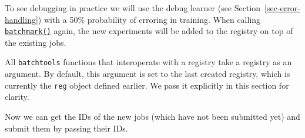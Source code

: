 To see debugging in practice we will use the debug
learner (see Section~\ref{sec-error-handling}) with a 50\% probability
of erroring in training. When calling
\href{https://mlr3batchmark.mlr-org.com/reference/batchmark.html}{\texttt{batchmark()}}
again, the new experiments will be added to the registry on top of the
existing jobs.

\begin{Shaded}
\begin{Highlighting}[]
\OtherTok{=} 
  \NormalTok{(}\NormalTok{, }  \NormalTok{)}

\end{Highlighting}
\end{Shaded}

\begin{tcolorbox}[enhanced jigsaw, opacitybacktitle=0.6, rightrule=.15mm, opacityback=0, arc=.35mm, breakable, titlerule=0mm, colframe=quarto-callout-tip-color-frame, coltitle=black, bottomrule=.15mm, toprule=.15mm, colback=white, colbacktitle=quarto-callout-tip-color!10!white, bottomtitle=1mm, toptitle=1mm, title=\textcolor{quarto-callout-tip-color}{\faLightbulb}\hspace{0.5em}{Registry Argument}, leftrule=.75mm, left=2mm]

All \texttt{batchtools} functions that interoperate with a registry take
a registry as an argument. By default, this argument is set to the last
created registry, which is currently the \texttt{reg} object defined
earlier. We pass it explicitly in this section for clarity.

\end{tcolorbox}

Now we can get the IDs of the new jobs (which have not been submitted
yet) and submit them by passing their IDs.

\begin{Shaded}
\begin{Highlighting}[]
\OtherTok{=} \NormalTok{(}
\end{Highlighting}
\end{Shaded}


